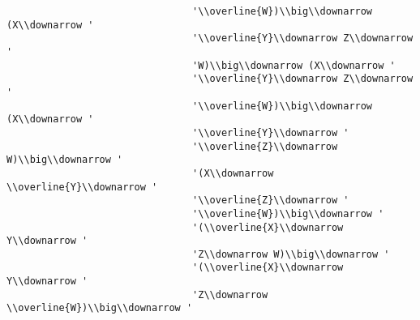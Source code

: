 \begin{verbatim}
                                '\\overline{W})\\big\\downarrow (X\\downarrow '
                                '\\overline{Y}\\downarrow Z\\downarrow '
                                'W)\\big\\downarrow (X\\downarrow '
                                '\\overline{Y}\\downarrow Z\\downarrow '
                                '\\overline{W})\\big\\downarrow (X\\downarrow '
                                '\\overline{Y}\\downarrow '
                                '\\overline{Z}\\downarrow W)\\big\\downarrow '
                                '(X\\downarrow \\overline{Y}\\downarrow '
                                '\\overline{Z}\\downarrow '
                                '\\overline{W})\\big\\downarrow '
                                '(\\overline{X}\\downarrow Y\\downarrow '
                                'Z\\downarrow W)\\big\\downarrow '
                                '(\\overline{X}\\downarrow Y\\downarrow '
                                'Z\\downarrow \\overline{W})\\big\\downarrow '

\end{verbatim}
